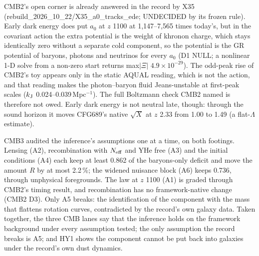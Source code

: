 \documentclass[10pt]{article}
\begin{document}
CMB2's open corner is already answered in the record by X35 (rebuild\_2026\_10\_22/X35\_a0\_tracks\_ede; UNDECIDED by its frozen rule). Early dark energy does put $a_0$ at $z$ 1100 at 1,147--7,565 times today's, but in the covariant action the extra potential is the weight of khronon charge, which stays identically zero without a separate cold component, so the potential is the GR potential of baryons, photons and neutrinos for every $a_0$ (D1 NULL; a nonlinear 1-D solve from a non-zero start returns max$|\Xi|$ $4.9\times10^{-29}$). The odd-peak rise of CMB2's toy appears only in the static AQUAL reading, which is not the action, and that reading makes the photon--baryon fluid Jeans-unstable at first-peak scales ($k_{\rm J}$ 0.024--0.039\,Mpc$^{-1}$). The full Boltzmann check CMB2 named is therefore not owed. Early dark energy is not neutral late, though: through the sound horizon it moves CFG689's native $\sqrt X$ at $z$ 2.33 from 1.00 to 1.49 (a flat-$\Lambda$ estimate).

CMB3 audited the inference's assumptions one at a time, on both footings. Lensing (A2), recombination with $N_{\rm eff}$ and YHe free (A3) and the initial conditions (A4) each keep at least 0.862 of the baryons-only deficit and move the amount $R$ by at most 2.2\,\%; the widened nuisance block (A6) keeps 0.736, through unphysical foregrounds. The law at $z$ 1100 (A1) is graded through CMB2's timing result, and recombination has no framework-native change (CMB2 D3). Only A5 breaks: the identification of the component with the mass that flattens rotation curves, contradicted by the record's own galaxy data.
Taken together, the three CMB lanes say that the inference holds on the framework background under every assumption tested; the only assumption the record breaks is A5; and HY1 shows the component cannot be put back into galaxies under the record's own dust dynamics.
\end{document}
